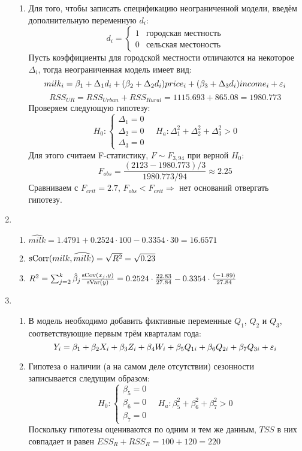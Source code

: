 \documentclass[12pt, a4paper]{article}
\theoremstyle{definition}
\begin{document}
\begin{enumerate}
\begin{enumerate}
\item Для того, чтобы записать спецификацию неограниченной модели, введём дополнительную переменную $d_i$:
\[
d_i = \begin{cases}
1 & \text{городская местность} \\
0 & \text{сельская местоность}
\end{cases}
\]
Пусть коэффициенты для городской местности отличаются на некоторое $\Delta_i$, тогда неограниченная модель имеет вид:
\[
milk_i = \beta_1 + \Delta_1 d_i + (\beta_2 + \Delta_2 d_i) price_i + (\beta_3 + \Delta_3 d_i) income_i + \varepsilon_i
\]
\[
RSS_{UR} = RSS_{Urban} + RSS_{Rural} = 1115.693 + 865.08 = 1980.773
\]
Проверяем следующую гипотезу:
\[
H_0: \begin{cases}
\Delta_1 = 0 \\
\Delta_2 = 0 \\
\Delta_3 = 0
\end{cases}
\quad
H_a: \Delta_1^2 + \Delta_2^2 + \Delta_3^2 >0
\]
Для этого считаем F-статистику, $F \sim F_{3, 94}$ при верной $H_0$:
\[
F_{obs} = \frac{(2123 - 1980.773)/3}{1980.773/94} \approx 2.25
\]
Сравниваем с $F_{crit} = 2.7$, $F_{obs} < F_{crit} \Rightarrow$ нет оснований отвергать гипотезу.
\end{enumerate}
\item
\begin{enumerate}
\item $\widehat{milk} = 1.4791 + 0.2524 \cdot 100 - 0.3354 \cdot 30 = 16.6571$
\item $\operatorname{sCorr}(milk, \widehat{milk}) = \sqrt{R^2} = \sqrt{0.23}$
\item $R^2 = \sum_{j=2}^{k} \hat{\beta}_j \frac{\operatorname{sCov}(x_j, y)}{\operatorname{sVar}(y)} = 0.2524 \cdot \frac{22.83}{27.84} - 0.3354 \cdot \frac{(-1.89)}{27.84}$
\end{enumerate}
\item
\begin{enumerate}
\item В модель необходимо добавить фиктивные переменные $Q_1$, $Q_2$ и $Q_3$, соответствующие первым трём кварталам года:
\[
Y_i = \beta_1 + \beta_2 X_i + \beta_3 Z_i + \beta_4 W_i + \beta_5 Q_{1i} + \beta_6 Q_{2i} + \beta_7 Q_{3i} + \varepsilon_i
\]
\item Гипотеза о наличии (а на самом деле отсутствии) сезонности записывается следущим образом:
\[
H_0: \begin{cases}
\beta_5 = 0 \\
\beta_6 = 0 \\
\beta_7 = 0
\end{cases}
\quad
H_{a}: \beta_5^2 + \beta_6^2 + \beta_7^2 > 0
\]
Поскольку гипотезы оцениваются по одним и тем же данным, $TSS$ в них совпадает и равен $ESS_{R} + RSS_{R} = 100 + 120 = 220$


\end{enumerate}
\end{enumerate}
\end{document}
